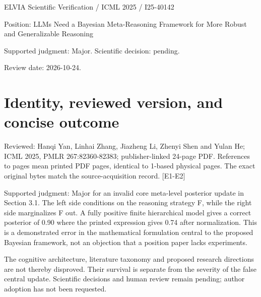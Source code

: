 \documentclass[10pt]{article}
\begin{document}
ELVIA Scientific Verification / ICML 2025 / I25-40142\par
Position: LLMs Need a Bayesian Meta-Reasoning Framework for More Robust and Generalizable Reasoning\par
Supported judgment: Major. Scientific decision: pending.\par
Review date: 2026-10-24.\par
\section*{Identity, reviewed version, and concise outcome}
Reviewed: Hanqi Yan, Linhai Zhang, Jiazheng Li, Zhenyi Shen and Yulan He; ICML 2025, PMLR 267:82360-82383; publisher-linked 24-page PDF. References to pages mean printed PDF pages, identical to 1-based physical pages. The exact original bytes match the source-acquisition record. [E1-E2]\par
Supported judgment: Major for an invalid core meta-level posterior update in Section 3.1. The left side conditions on the reasoning strategy F, while the right side marginalizes F out. A fully positive finite hierarchical model gives a correct posterior of 0.90 where the printed expression gives 0.74 after normalization. This is a demonstrated error in the mathematical formulation central to the proposed Bayesian framework, not an objection that a position paper lacks experiments.\par
The cognitive architecture, literature taxonomy and proposed research directions are not thereby disproved. Their survival is separate from the severity of the false central update. Scientific decisions and human review remain pending; author adoption has not been requested.\par
\end{document}
